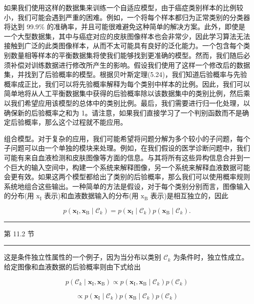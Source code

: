 \documentclass[10pt]{report}
\newcommand{\HRule}{\begin{center}\rule{0.9\linewidth}{0.2mm}\end{center}}
\begin{document}
如果我们使用这样的数据集来训练一个自适应模型，由于癌症类别样本的比例较小，我们可能会遇到严重的困难。例如，一个将每个样本都归为正常类别的分类器将达到 99.9\% 的准确率，并且可能很难避免这种简单的解决方案。此外，即使是一个大型数据集，其中与癌症对应的皮肤图像样本也会非常少，因此学习算法无法接触到广泛的此类图像样本，从而不太可能具有良好的泛化能力。一个包含每个类别数量相等样本的平衡数据集将使我们能够找到更准确的模型。然而，我们随后必须补偿对训练数据进行修改所产生的影响。假设我们使用了这样一个修改后的数据集，并找到了后验概率的模型。根据贝叶斯定理(5.24)，我们知道后验概率与先验概率成正比，我们可以将先验概率解释为每个类别中样本的比例。因此，我们可以简单地将从人工平衡数据集中获得的后验概率除以该数据集中的类别比例，然后乘以我们希望应用该模型的总体中的类别比例。最后，我们需要进行归一化处理，以确保新的后验概率之和为 1。请注意，如果我们直接学习了一个判别函数而不是确定后验概率，那么这个过程就不能应用。

组合模型。对于复杂的应用，我们可能希望将问题分解为多个较小的子问题，每个子问题可以由一个单独的模块来处理。例如，在我们假设的医学诊断问题中，我们可能有来自血液检测和皮肤图像等方面的信息。与其将所有这些异构信息合并到一个巨大的输入空间中，构建一个系统来解释图像，另一个系统来解释血液数据可能会更有效。如果这两个模型都给出了类别的后验概率，那么我们可以使用概率规则系统地组合这些输出。一种简单的方法是假设，对于每个类别分别而言，图像输入的分布(用 \({\mathrm{x}}_{\mathrm{I}}\) 表示)和血液数据输入的分布(用 \({\mathrm{x}}_{\mathrm{B}}\) 表示)是相互独立的，因此

\[
p\left( {{\mathbf{x}}_{\mathrm{I}},{\mathbf{x}}_{\mathrm{B}} \mid  {\mathcal{C}}_{k}}\right)  = p\left( {{\mathbf{x}}_{\mathrm{I}} \mid  {\mathcal{C}}_{k}}\right) p\left( {{\mathbf{x}}_{\mathrm{B}} \mid  {\mathcal{C}}_{k}}\right) . \tag{5.26}
\]

\HRule

第 11.2 节

\HRule

这是条件独立性属性的一个例子，因为当分布以类别 \({\mathcal{C}}_{k}\) 为条件时，独立性成立。给定图像和血液数据的后验概率则由下式给出

\[
p\left( {{\mathcal{C}}_{k} \mid  {\mathbf{x}}_{\mathrm{I}},{\mathbf{x}}_{\mathrm{B}}}\right)  \propto  p\left( {{\mathbf{x}}_{\mathrm{I}},{\mathbf{x}}_{\mathrm{B}} \mid  {\mathcal{C}}_{k}}\right) p\left( {\mathcal{C}}_{k}\right)
\]

\[
\propto  p\left( {{\mathbf{x}}_{\mathrm{I}} \mid  {\mathcal{C}}_{k}}\right) p\left( {{\mathbf{x}}_{\mathrm{B}} \mid  {\mathcal{C}}_{k}}\right) p\left( {\mathcal{C}}_{k}\right)
\]
\end{document}
